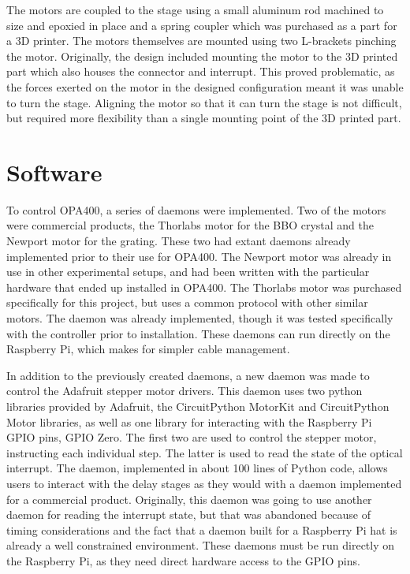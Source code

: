 The motors are coupled to the stage using a small aluminum rod machined to size and epoxied in place and a spring coupler which was purchased as a part for a 3D printer\cite{}.
The motors themselves are mounted using two L-brackets pinching the motor.
Originally, the design included mounting the motor to the 3D printed part which also houses the connector and interrupt.
This proved problematic, as the forces exerted on the motor in the designed configuration meant it was unable to turn the stage.
Aligning the motor so that it can turn the stage is not difficult, but required more flexibility than a single mounting point of the 3D printed part.


\clearpage

\section{Software}  %

To control OPA400, a series of \yaq{} daemons were implemented.
Two of the motors were commercial products, the Thorlabs motor for the BBO crystal and the Newport motor for the grating.
These two had extant daemons already implemented prior to their use for OPA400\cite{}\cite{}.
The Newport motor was already in use in other experimental setups, and had been written with the particular hardware that ended up installed in OPA400.
The Thorlabs motor was purchased specifically for this project, but uses a common protocol with other similar motors.
The daemon was already implemented, though it was tested specifically with the controller prior to installation.
These daemons can run directly on the Raspberry Pi, which makes for simpler cable management.

In addition to the previously created daemons, a new daemon was made to control the Adafruit stepper motor drivers.
This daemon uses two python libraries provided by Adafruit, the CircuitPython MotorKit\cite{} and CircuitPython Motor\cite{} libraries, as well as one library for interacting with the Raspberry Pi GPIO pins, GPIO Zero\cite{}.
The first two are used to control the stepper motor, instructing each individual step.
The latter is used to read the state of the optical interrupt.
The daemon, implemented in about 100 lines of Python code, allows users to interact with the delay stages as they would with a daemon implemented for a commercial product.
Originally, this daemon was going to use another daemon for reading the interrupt state, but that was abandoned because of timing considerations and the fact that a daemon built for a Raspberry Pi hat is already a well constrained environment.
These daemons must be run directly on the Raspberry Pi, as they need direct hardware access to the GPIO pins.

